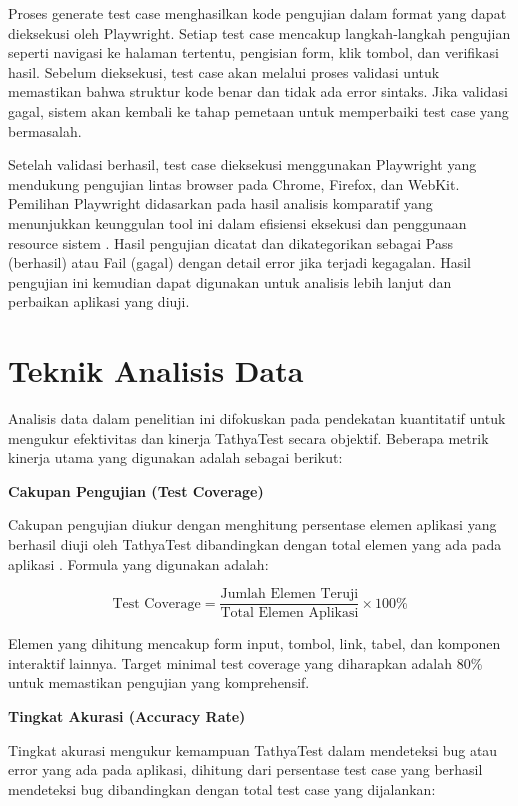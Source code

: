 Proses generate test case menghasilkan kode pengujian dalam format yang dapat dieksekusi oleh Playwright. Setiap test case mencakup langkah-langkah pengujian seperti navigasi ke halaman tertentu, pengisian form, klik tombol, dan verifikasi hasil. Sebelum dieksekusi, test case akan melalui proses validasi untuk memastikan bahwa struktur kode benar dan tidak ada error sintaks. Jika validasi gagal, sistem akan kembali ke tahap pemetaan untuk memperbaiki test case yang bermasalah.

Setelah validasi berhasil, test case dieksekusi menggunakan Playwright yang mendukung pengujian lintas browser pada Chrome, Firefox, dan WebKit. Pemilihan Playwright didasarkan pada hasil analisis komparatif yang menunjukkan keunggulan tool ini dalam efisiensi eksekusi dan penggunaan resource sistem \parencite{mon2025}. Hasil pengujian dicatat dan dikategorikan sebagai Pass (berhasil) atau Fail (gagal) dengan detail error jika terjadi kegagalan. Hasil pengujian ini kemudian dapat digunakan untuk analisis lebih lanjut dan perbaikan aplikasi yang diuji.

\section{Teknik Analisis Data}\label{teknik-analisis-data}

Analisis data dalam penelitian ini difokuskan pada pendekatan kuantitatif untuk mengukur efektivitas dan kinerja TathyaTest secara objektif. Beberapa metrik kinerja utama yang digunakan adalah sebagai berikut:

\textbf{Cakupan Pengujian (Test Coverage)}

Cakupan pengujian diukur dengan menghitung persentase elemen aplikasi yang berhasil diuji oleh TathyaTest dibandingkan dengan total elemen yang ada pada aplikasi \parencite{romano2022}. Formula yang digunakan adalah:

\begin{equation}
\text{Test Coverage} = \frac{\text{Jumlah Elemen Teruji}}{\text{Total Elemen Aplikasi}} \times 100\%
\end{equation}

Elemen yang dihitung mencakup form input, tombol, link, tabel, dan komponen interaktif lainnya. Target minimal test coverage yang diharapkan adalah 80\% untuk memastikan pengujian yang komprehensif.

\textbf{Tingkat Akurasi (Accuracy Rate)}

Tingkat akurasi mengukur kemampuan TathyaTest dalam mendeteksi bug atau error yang ada pada aplikasi, dihitung dari persentase test case yang berhasil mendeteksi bug dibandingkan dengan total test case yang dijalankan:

